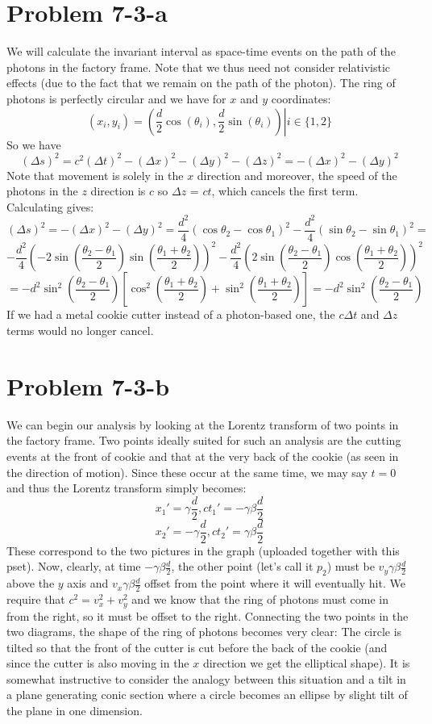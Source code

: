 \section*{Problem 7-3-a}
We will calculate the invariant interval as space-time events on the path of the photons in the factory frame. Note that we thus need not consider relativistic effects (due to the fact that we remain on the path of the photon). The ring of photons is perfectly circular and we have for $x$ and $y$ coordinates:
\[ (x_i,y_i) = \left. (\frac{d}{2}\cos(\theta_i),\frac{d}{2}\sin(\theta_i)) \right| i\in \{1,2\} \]
So we have
\[ (\Delta s)^2 = c^2(\Delta t)^2 -(\Delta x)^2 - (\Delta y)^2 - (\Delta z)^2 = -(\Delta x)^2 - (\Delta y)^2 \]
Note that movement is solely in the $x$ direction and moreover, the speed of the photons in the $z$ direction is $c$ so $\Delta z$ = $ct$, which cancels the first term.
Calculating gives:
\[ (\Delta s)^2 = -(\Delta x)^2 - (\Delta y)^2  = \frac{d^2}{4}(\cos\theta_2-\cos\theta_1)^2 - \frac{d^2}{4}(\sin\theta_2-\sin\theta_1)^2 =\]\[ -\frac{d^2}{4}\left(-2\sin\left(\frac{\theta_2-\theta_1}{2}\right)\sin\left(\frac{\theta_1+\theta_2}{2}\right)\right)^2 - \frac{d^2}{4}\left(2\sin\left(\frac{\theta_2-\theta_1}{2}\right)\cos\left(\frac{\theta_1+\theta_2}{2}\right)\right)^2   \]
\[ = -d^2\sin^2\left(\frac{\theta_2-\theta_1}{2}\right)\left[\cos^2\left(\frac{\theta_1+\theta_2}{2}\right) + \sin^2\left(\frac{\theta_1+\theta_2}{2}\right)\right] = -d^2\sin^2\left(\frac{\theta_2-\theta_1}{2}\right) \]
If we had a metal cookie cutter instead of a photon-based one, the $c\Delta t$ and $\Delta z$ terms would no longer cancel. 
\section*{Problem 7-3-b}
We can begin our analysis by looking at the Lorentz transform of two points in the factory frame. Two points ideally suited for such an analysis are the cutting events at the front of cookie and that at the very back of the cookie (as seen in the direction of motion). Since these occur at the same time, we may say $t=0$ and thus the Lorentz transform simply becomes:
\[ x_1' = \gamma \frac{d}{2}, ct_1' = -\gamma\beta\frac{d}{2} \]
\[ x_2' = -\gamma \frac{d}{2}, ct_2' = \gamma\beta\frac{d}{2} \]
These correspond to the two pictures in the graph (uploaded together with this pset). Now, clearly, at time $-\gamma\beta\frac{d}{2}$, the other point (let's call it $p_2$) must be $v_y\gamma\beta\frac{d}{2}$ above the $y$ axis and $v_x\gamma\beta\frac{d}{2}$ offset from the point where it will eventually hit. We require that $c^2 = v_x^2+v_y^2$ and we know that the ring of photons must come in from the right, so it must be offset to the right. Connecting the two points in the two diagrams, the shape of the ring of photons becomes very clear: The circle is tilted so that the front of the cutter is cut before the back of the cookie (and since the cutter is also moving in the $x$ direction we get  the elliptical shape). It is somewhat instructive to consider the analogy between this situation and a tilt in a plane generating conic section where a circle becomes an ellipse by slight tilt of the plane in one dimension. 
